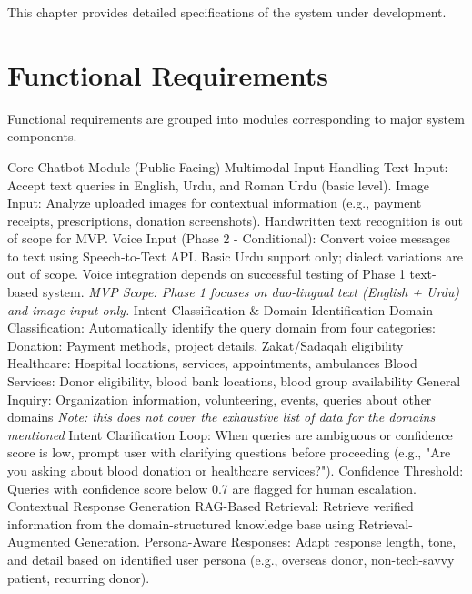 This chapter provides detailed specifications of the system under development.

\section{Functional Requirements}

Functional requirements are grouped into modules corresponding to major system components. 
\begin{outline}
  \1 Core Chatbot Module (Public Facing)
  \2 Multimodal Input Handling
  \3 Text Input: Accept text queries in English, Urdu, and Roman Urdu (basic level).
  \3 Image Input: Analyze uploaded images for contextual information (e.g., payment receipts, prescriptions, donation screenshots). Handwritten text recognition is out of scope for MVP. 
  \3 Voice Input (Phase 2 - Conditional): Convert voice messages to text using Speech-to-Text API. Basic Urdu support only; dialect variations are out of scope. Voice integration depends on successful testing of Phase 1 text-based system. 
  \4 \textit{MVP Scope: Phase 1 focuses on duo-lingual text (English + Urdu) and image input only.}
  \2 Intent Classification \& Domain Identification 
  \3 Domain Classification: Automatically identify the query domain from four categories:  
  \4 Donation: Payment methods, project details, Zakat/Sadaqah eligibility 
  \4 Healthcare: Hospital locations, services, appointments, ambulances 
  \4 Blood Services: Donor eligibility, blood bank locations, blood group availability 
  \4 General Inquiry: Organization information, volunteering, events, queries about other domains
  \4 \textit{Note: this does not cover the exhaustive list of data for the domains mentioned}
  \3 Intent Clarification Loop: When queries are ambiguous or confidence score is low, prompt user with clarifying questions before proceeding (e.g., "Are you asking about blood donation or healthcare services?"). 
  \3 Confidence Threshold: Queries with confidence score below 0.7 are flagged for human escalation. 
  \2 Contextual Response Generation 
  \3 RAG-Based Retrieval: Retrieve verified information from the domain-structured knowledge base using Retrieval-Augmented Generation. 
  \3 Persona-Aware Responses: Adapt response length, tone, and detail based on identified user persona (e.g., overseas donor, non-tech-savvy patient, recurring donor). 

\end{outline}
